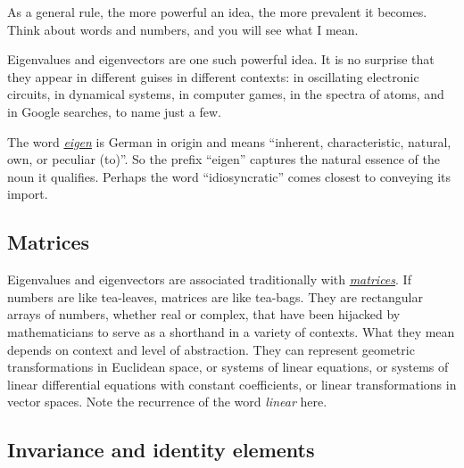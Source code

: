 \documentclass[
  11pt,
  british,
  a4paper,
]{article}
\begin{document}
As a general rule, the more powerful an idea, the more prevalent it
becomes. Think about words and numbers, and you will see what I mean.

Eigenvalues and eigenvectors are one such powerful idea. It is no
surprise that they appear in different guises in different contexts: in
oscillating electronic circuits, in dynamical systems, in computer
games, in the spectra of atoms, and in Google searches, to name just a
few.

The word
\href{https://en.wikipedia.org/wiki/Talk:Eigenvector}{\emph{eigen}} is
German in origin and means ``inherent, characteristic, natural, own, or
peculiar (to)''. So the prefix ``eigen'' captures the natural essence of
the noun it qualifies. Perhaps the word ``idiosyncratic'' comes closest
to conveying its import.

\hypertarget{matrices}{%
\subsection{Matrices}\label{matrices}}

Eigenvalues and eigenvectors are associated traditionally with
\href{https://en.wikipedia.org/wiki/Matrix_\%28mathematics\%29}{\emph{matrices}}.
If numbers are like tea-leaves, matrices are like tea-bags. They are
rectangular arrays of numbers, whether real or complex, that have been
hijacked by mathematicians to serve as a shorthand in a variety of
contexts. What they mean depends on context and level of abstraction.
They can represent geometric transformations in Euclidean space, or
systems of linear equations, or systems of linear differential equations
with constant coefficients, or linear transformations in vector spaces.
Note the recurrence of the word \emph{linear} here.

\hypertarget{invariance-and-identity-elements}{%
\subsection{Invariance and identity
elements}\label{invariance-and-identity-elements}}
\end{document}
